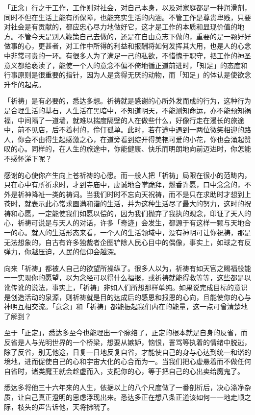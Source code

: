 \documentclass[twoside,openany]{book}
\begin{document}
「正念」行之于工作，工作则对社会，对自己本身，以及对家庭都是一种润滑剂，同时不但在生活上能有所保障，也能充实生活的内涵。不管工作是尊贵卑贱，只要对社会是有贡献的，都应忠心尽力地做好它，这才是工作的本质和显现价值的地方。不管今天是别人鞭策自己去做的，还是在自由意志下做的，重要的是一颗好好做事的心，更甚者，对工作中所得的利益和报酬将如何发挥其大用，也是人的心念中非常可贵的一环。有很多人为了满足一己的私欲，不惜愧于职守，把工作的神圣意义都给亵渎了，能使一个人的意念不偏不倚地循正道前进时，「知足」的态度和行事原则是很重要的指针，因为人是贪得无厌的动物，而「知足」的体认是使欲念升华的起点。

「祈祷」是有必要的，悉达多想。祈祷就是感谢的心所外发而成的行为，这种行为是合理生活的基石，人生活在黑暗中，不知道明天，不能测知命运，亦不能预知祸福，中间隔了一道墙，就难以揣度隔壁的人在做些什么，好像行走在漫长的旅途中，前不见店，后不着村的，伶仃孤单。此时，若在途中遇到一两位微笑相迎的路人，你会不由得生起感激之心，在道旁看到绽开得美艳可爱的小花，你也会涌起赞叹的心。同样的，在人生的旅途中，你能健康、快乐而明朗地向前迈进时，你怎能不感怀涕下呢？

感谢的心使你产生向上苍祈祷的心愿。而一般人把「祈祷」局限在很小的范畴内，只在心中有所祈求时，才到寺庙中，虔诚地合掌跪拜，燃香许愿，口中念念的，不外是祈神降祉一类的祷词。当我们时时不忘向天祝祷，而不是只在求助时才想到上苍时，就表示此心常求圆满和谐的生活，并为这种生活尽了最大的努力，这时的祝祷和心愿，一定能使我们如愿以偿的，因为我们抛弃了我执的观念，印证了天人的心，祈祷可说是与天人的对话，许多「奇迹」会发生，都源于有这样一颗与天地合一的心。就人的生活形态来看，一个人的生活领域中，没有神明可让你祝祷，那是无法想象的，自古有许多独裁者企图铲除人民心目中的偶像，事实上，如球之有反弹力，你越压迫，人民的信仰会越深。

向来「祈祷」都被人自己的欲望所操纵了。很多人以为，祈祷有如天官之赐福般能一一实现你的愿望，以为念经可以得什么福报，或祈祷就能得救等等，这些都是以讹传讹的说法，事实上，「祈祷」非如人们所想那样单纯。如果说完成目标的意识是创造活动的泉源，则祈祷就是目的达成后的感恩和报恩的心向，且能使你的心与神明互相交流。「意念」和「祈祷」都能振起我们内在的能量，这一点可曾清楚地了解到？

至于「正定」，悉达多至今也能理出一个脉络了，正定的根本就是自身的反省，而反省是人与光明世界的一个桥梁，想要从嫉妒，恼恨，詈骂等执着的情绪中脱逃，除了反省，别无他途，日复一日地反复自省，才能使自己的身与心达到统一和谐的境地，进而促使自己的心和宇宙大化的心合而为一。当我们把心虚悬着而不做任何自省时，诸类魔王就会趁虚而入，支配你的心，等于把自己的心出卖给魔鬼了。

悉达多将他三十六年来的人生，依据以上的八个尺度做了一番剖析后，决心涤净杂质，让自己真正澄明的思虑浮现出来。悉达多正在想八条正道该如何一一地走顺之际，枝头的声告诉他，天将拂晓了。
\end{document}

